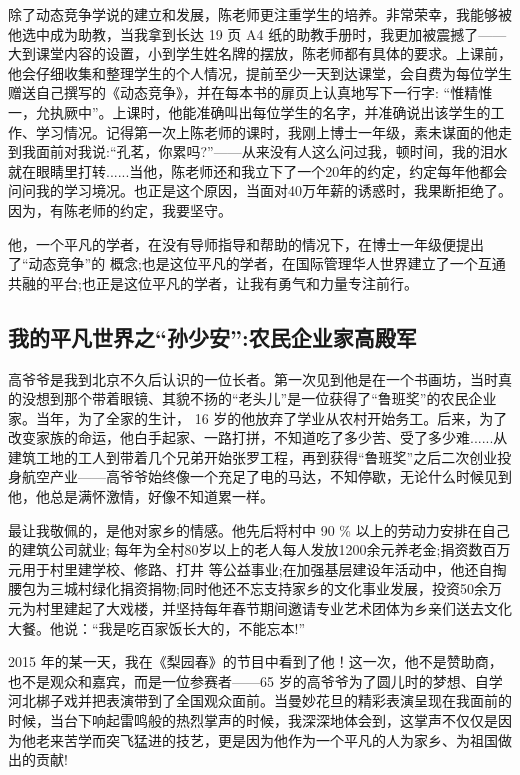 \documentclass[openany,scheme = chinese, linespread = 1.5]{ctexbook}
\begin{document}
    除了动态竞争学说的建立和发展，陈老师更注重学生的培养。非常荣幸，我能够被他选中成为助教，当我拿到长达 19 页 A4 纸的助教手册时，我更加被震撼了——大到课堂内容的设置，小到学生姓名牌的摆放，陈老师都有具体的要求。上课前，他会仔细收集和整理学生的个人情况，提前至少一天到达课堂，会自费为每位学生赠送自己撰写的《动态竞争》，并在每本书的扉页上认真地写下一行字: “惟精惟一，允执厥中”。上课时，他能准确叫出每位学生的名字，并准确说出该学生的工作、学习情况。记得第一次上陈老师的课时，我刚上博士一年级，素未谋面的他走到我面前对我说:“孔茗，你累吗?”——从来没有人这么问过我，顿时间，我的泪水就在眼睛里打转......当他，陈老师还和我立下了一个20年的约定，约定每年他都会问问我的学习境况。也正是这个原因，当面对40万年薪的诱惑时，我果断拒绝了。因为，有陈老师的约定，我要坚守。 
    
    他，一个平凡的学者，在没有导师指导和帮助的情况下，在博士一年级便提出了“动态竞争”的 概念;也是这位平凡的学者，在国际管理华人世界建立了一个互通共融的平台;也正是这位平凡的学者，让我有勇气和力量专注前行。 
    
\subsection*{我的平凡世界之“孙少安”:农民企业家高殿军}

    高爷爷是我到北京不久后认识的一位长者。第一次见到他是在一个书画坊，当时真的没想到那个带着眼镜、其貌不扬的“老头儿”是一位获得了“鲁班奖”的农民企业家。当年，为了全家的生计， 16 岁的他放弃了学业从农村开始务工。后来，为了改变家族的命运，他白手起家、一路打拼，不知道吃了多少苦、受了多少难......从建筑工地的工人到带着几个兄弟开始张罗工程，再到获得“鲁班奖”之后二次创业投身航空产业——高爷爷始终像一个充足了电的马达，不知停歇，无论什么时候见到他，他总是满怀激情，好像不知道累一样。 
    
    最让我敬佩的，是他对家乡的情感。他先后将村中 90 \% 以上的劳动力安排在自己的建筑公司就业; 每年为全村80岁以上的老人每人发放1200余元养老金;捐资数百万元用于村里建学校、修路、打井 等公益事业;在加强基层建设年活动中，他还自掏腰包为三城村绿化捐资捐物;同时他还不忘支持家乡的文化事业发展，投资50余万元为村里建起了大戏楼，并坚持每年春节期间邀请专业艺术团体为乡亲们送去文化大餐。他说：“我是吃百家饭长大的，不能忘本!” 
    
    2015 年的某一天，我在《梨园春》的节目中看到了他！这一次，他不是赞助商，也不是观众和嘉宾，而是一位参赛者——65 岁的高爷爷为了圆儿时的梦想、自学河北梆子戏并把表演带到了全国观众面前。当曼妙花旦的精彩表演呈现在我面前的时候，当台下响起雷鸣般的热烈掌声的时候，我深深地体会到，这掌声不仅仅是因为他老来苦学而突飞猛进的技艺，更是因为他作为一个平凡的人为家乡、为祖国做出的贡献! 
    
\end{document}
